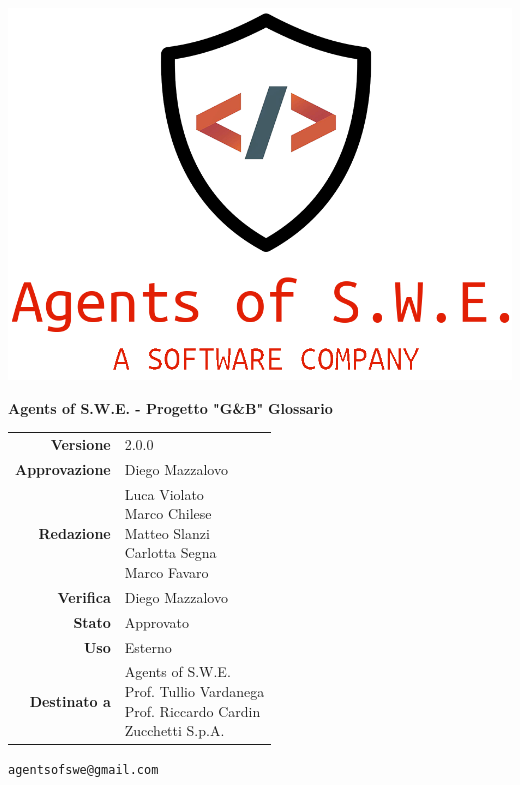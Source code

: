 


\begin{titlepage}
\thispagestyle{empty}

\begin{center}

\includegraphics[scale=0.3]{./images/logo.png} 

\large \textbf{Agents of S.W.E. - Progetto "G\&B"}
\vfill
\Huge \textbf{Glossario}
\vfill
\large
\renewcommand{\arraystretch}{1.3}
\begin{tabular}{r|l}
\textbf{Versione} & 2.0.0 \\
\textbf{Approvazione} & Diego Mazzalovo\\
\textbf{Redazione} & \parbox[t]{5cm}{Luca Violato\\Marco Chilese\\Matteo Slanzi\\Carlotta Segna\\ Marco Favaro}\\
\textbf{Verifica} & \parbox[t]{5cm}{Diego Mazzalovo}\\
\textbf{Stato} & Approvato \\
\textbf{Uso} & Esterno\\
\textbf{Destinato a} & \parbox[t]{5cm}{Agents of S.W.E. \\Prof. Tullio Vardanega\\Prof. Riccardo Cardin\\ Zucchetti S.p.A.}
\end{tabular}
\vfill
\small
\texttt{agentsofswe@gmail.com}
\end{center}
\end{titlepage}

